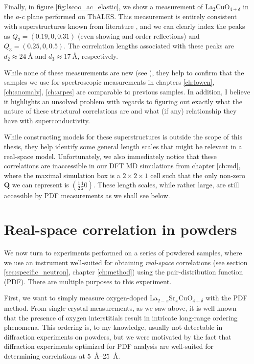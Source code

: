 Finally, in figure \ref{fig:lscoo_ac_elastic}, we show a measurement of La$_2$CuO$_{4+\delta}$ in the $a$-$c$ plane performed on ThALES. This measurement is entirely consistent with superstructures known from literature \cite{Kusmartsev2000}, and we can clearly index the peaks as $Q_2 = (0.19, 0, 0.31)$ (even showing  and  order reflections) and $Q_3 = (0.25,0,0.5)$. The correlation lengths associated with these peaks are $d_2 \approx \SI{24}{\angstrom}$ and $d_3 \approx \SI{17}{\angstrom}$, respectively.

While none of these measurements are new (see \cite[Chapter 10]{Ray2016}), they help to confirm that the samples we use for spectroscopic measurements in chapters \ref{ch:lowen}, \ref{ch:anomaly}, \ref{ch:arpes} are comparable to previous samples. In addition, I believe it highlights an unsolved problem with regards to figuring out exactly what the nature of these structural correlations are and what (if any) relationship they have with superconductivity.

While constructing models for these superstructures is outside the scope of this thesis, they help identify some general length scales that might be relevant in a real-space model. Unfortunately, we also immediately notice that these correlations are inaccessible in our DFT MD simulations from chapter \ref{ch:md}, where the maximal simulation box is a $2 \times 2 \times 1$ cell such that the only non-zero $\bm{Q}$ we can represent is $(\frac{1}{2}\frac{1}{2}{0})$. These length scales, while rather large, are still accessible by PDF measurements as we shall see below.

\section{Real-space correlation in powders}
We now turn to experiments performed on a series of powdered samples, where we use an instrument well-suited for obtaining \emph{real-space} correlations (see section \ref{sec:specific_neutron}, chapter \ref{ch:method}) using the pair-distribution function (PDF). There are multiple purposes to this experiment. 

First, we want to simply measure oxygen-doped La$_{2-x}$Sr$_x$CuO$_{4+\delta}$ with the PDF method. From single-crystal measurements, as we saw above, it is well known that the presence of oxygen interstitials result in intricate long-range ordering phenomena. This ordering is, to my knowledge, usually not detectable in diffraction experiments on powders, but we were motivated by the fact that diffraction experiments optimized for PDF analysis are well-suited for determining correlations at \SIrange{5}{25}{\angstrom}.

